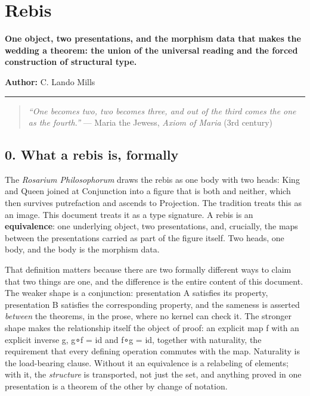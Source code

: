 \hypertarget{rebis}{%
\section{Rebis}\label{rebis}}

\textbf{One object, two presentations, and the morphism data that makes
the wedding a theorem: the union of the universal reading and the forced
construction of structural type.}

\textbf{Author:} C. Lando Mills

\begin{center}\rule{0.5\linewidth}{0.5pt}\end{center}

\begin{quote}
\emph{``One becomes two, two becomes three, and out of the third comes
the one as the fourth.''} --- Maria the Jewess, \emph{Axiom of Maria}
(3rd century)
\end{quote}

\hypertarget{what-a-rebis-is-formally}{%
\subsection{0. What a rebis is,
formally}\label{what-a-rebis-is-formally}}

The \emph{Rosarium Philosophorum} draws the rebis as one body with two
heads: King and Queen joined at Conjunction into a figure that is both
and neither, which then survives putrefaction and ascends to Projection.
The tradition treats this as an image. This document treats it as a type
signature. A rebis is an \textbf{equivalence}: one underlying object,
two presentations, and, crucially, the maps between the presentations
carried as part of the figure itself. Two heads, one body, and the body
is the morphism data.

That definition matters because there are two formally different ways to
claim that two things are one, and the difference is the entire content
of this document. The weaker shape is a conjunction: presentation A
satisfies its property, presentation B satisfies the corresponding
property, and the sameness is asserted \emph{between} the theorems, in
the prose, where no kernel can check it. The stronger shape makes the
relationship itself the object of proof: an explicit map f with an
explicit inverse g, g∘f = id and f∘g = id, together with naturality, the
requirement that every defining operation commutes with the map.
Naturality is the load-bearing clause. Without it an equivalence is a
relabeling of elements; with it, the \emph{structure} is transported,
not just the set, and anything proved in one presentation is a theorem
of the other by change of notation.

